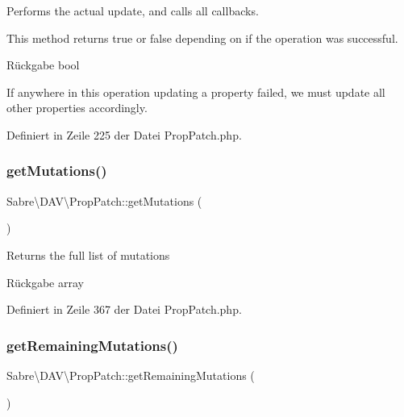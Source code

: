 Performs the actual update, and calls all callbacks.

This method returns true or false depending on if the operation was successful.

\begin{DoxyReturn}{Rückgabe}
bool 
\end{DoxyReturn}
If anywhere in this operation updating a property failed, we must update all other properties accordingly.

Definiert in Zeile 225 der Datei Prop\+Patch.\+php.

\mbox{\label{class_sabre_1_1_d_a_v_1_1_prop_patch_af414b039ec976327251bd681765f33c5}} 
\subsubsection{\texorpdfstring{get\+Mutations()}{getMutations()}}
{\footnotesize\ttfamily Sabre\textbackslash{}\+D\+A\+V\textbackslash{}\+Prop\+Patch\+::get\+Mutations (\begin{DoxyParamCaption}{ }\end{DoxyParamCaption})}

Returns the full list of mutations

\begin{DoxyReturn}{Rückgabe}
array 
\end{DoxyReturn}


Definiert in Zeile 367 der Datei Prop\+Patch.\+php.

\mbox{\label{class_sabre_1_1_d_a_v_1_1_prop_patch_aa99c5975683d4d41a7f20d660380575a}} 
\subsubsection{\texorpdfstring{get\+Remaining\+Mutations()}{getRemainingMutations()}}
{\footnotesize\ttfamily Sabre\textbackslash{}\+D\+A\+V\textbackslash{}\+Prop\+Patch\+::get\+Remaining\+Mutations (\begin{DoxyParamCaption}{ }\end{DoxyParamCaption})}

